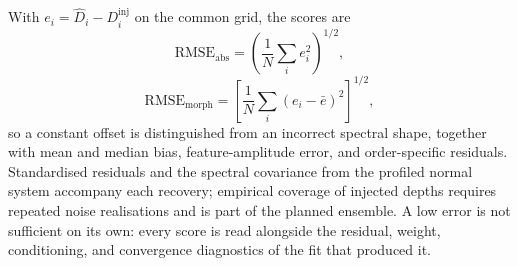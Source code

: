 With $e_i=\widehat D_i-D_i^{\mathrm{inj}}$ on the common grid, the scores
are
\begin{equation}
 \mathrm{RMSE}_{\mathrm{abs}}=
 \left(\frac{1}{N}\sum_i e_i^2\right)^{1/2},
 \label{eq:absolute-rmse}
\end{equation}
\begin{equation}
 \mathrm{RMSE}_{\mathrm{morph}}=
 \left[\frac{1}{N}\sum_i(e_i-\bar e)^2\right]^{1/2},
 \label{eq:morphology-rmse}
\end{equation}
so a constant offset is distinguished from an incorrect spectral shape,
together with mean and median bias, feature-amplitude error, and
order-specific residuals. Standardised residuals and the spectral
covariance from the profiled normal system accompany each recovery;
empirical coverage of injected depths requires repeated noise
realisations and is part of the planned ensemble. A low error is not
sufficient on its own: every score is read alongside the residual,
weight, conditioning, and convergence diagnostics of the fit that
produced it.
